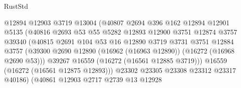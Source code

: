 \begin{lexlean}{RustStd}
\begin{coremodule}
                                    @12894
                                    @12903
                                    @3719
                                    @13004
                                    (@40807
                                      @2694
                                      @396
                                      @162
                                      @12894
                                      @12901
                                      @5135
                                      (@40816
                                        @2693
                                        @53
                                        @55
                                        @5282
                                        @12893
                                        @12900
                                        @3751
                                        @12874
                                        @3757
                                        @39340
                                        (@40815
                                          @2691
                                          @104
                                          @53
                                          @16
                                          @12890
                                          @3719
                                          @3731
                                          @3751
                                          @12884
                                          @3757
                                          (@39300
                                            @2690
                                            @12890
                                            (@16962 (@16963 @12890))
                                            (@16272 (@16968 @2690 @53)))
                                          @39267
                                          @16559
                                          (@16272 (@16561 @12885 @3719)))
                                        @16559
                                        (@16272 (@16561 @12875 @12893)))
                                      @23302
                                      @23305
                                      @23308
                                      @23312
                                      @23317
                                      @40186)
                                    (@40861
                                      @12903
                                      @2717
                                      @2739
                                      @13
                                      @12928

\end{coremodule}
\end{lexlean}
